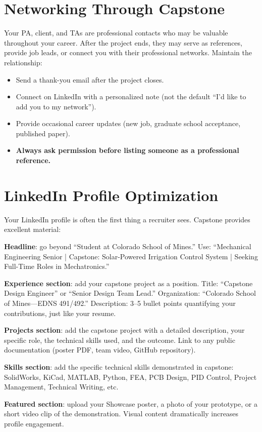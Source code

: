\section{Networking Through Capstone}
Your PA, client, and TAs are professional contacts who may be valuable throughout your career. After the project ends, they may serve as references, provide job leads, or connect you with their professional networks. Maintain the relationship:

\begin{itemize}[nosep,leftmargin=1.5em]
\item Send a thank-you email after the project closes.
\item Connect on LinkedIn with a personalized note (not the default ``I'd like to add you to my network'').
\item Provide occasional career updates (new job, graduate school acceptance, published paper).
\item \textbf{Always ask permission before listing someone as a professional reference.}
\end{itemize}

\section{LinkedIn Profile Optimization}
Your LinkedIn profile is often the first thing a recruiter sees. Capstone provides excellent material:

\textbf{Headline}: go beyond ``Student at Colorado School of Mines.'' Use: ``Mechanical Engineering Senior | Capstone: Solar-Powered Irrigation Control System | Seeking Full-Time Roles in Mechatronics.''

\textbf{Experience section}: add your capstone project as a position. Title: ``Capstone Design Engineer'' or ``Senior Design Team Lead.'' Organization: ``Colorado School of Mines---EDNS 491/492.'' Description: 3--5 bullet points quantifying your contributions, just like your resume.

\textbf{Projects section}: add the capstone project with a detailed description, your specific role, the technical skills used, and the outcome. Link to any public documentation (poster PDF, team video, GitHub repository).

\textbf{Skills section}: add the specific technical skills demonstrated in capstone: SolidWorks, KiCad, MATLAB, Python, FEA, PCB Design, PID Control, Project Management, Technical Writing, etc.

\textbf{Featured section}: upload your Showcase poster, a photo of your prototype, or a short video clip of the demonstration. Visual content dramatically increases profile engagement.

